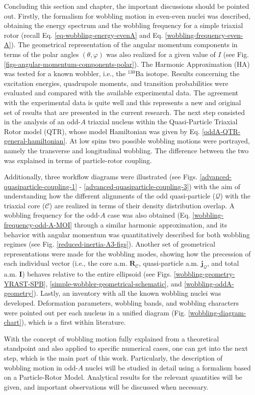 Concluding this section and chapter, the important discussions should be pointed out. Firstly, the formalism for wobbling motion in even-even nuclei was described, obtaining the energy spectrum and the wobbling frequency for a simple triaxial rotor (recall Eq. \ref{eq-wobbling-energy-evenA} and Eq. \ref{wobbling-frequency-even-A}). The geometrical representation of the angular momentum components in terms of the polar angles $(\theta,\varphi)$ was also realized for a given value of $I$ (see Fig. \ref{figs-angular-momentum-components-polar}). The Harmonic Approximation (HA) was tested for a known wobbler, i.e., the $^{130}$Ba isotope. Results concerning the excitation energies, quadrupole moments, and transition probabilities were evaluated and compared with the available experimental data. The agreement with the experimental data is quite well and this represents a new and original set of results that are presented in the current research. The next step consisted in the analysis of an odd-$A$ triaxial nucleus within the Quasi-Particle Triaxial Rotor model (QTR), whose model Hamiltonian was given by Eq. \ref{oddA-QTR-general-hamiltonian}. At low spins two possible wobbling motions were portrayed, namely the transverse and longitudinal wobbling. The difference between the two was explained in terms of particle-rotor coupling. 

Additionally, three workflow diagrams were illustrated (see Figs. \ref{advanced-quasiparticle-coupling-1} - \ref{advanced-quasiparticle-coupling-3}) with the aim of understanding how the different alignments of the odd quasi-particle ($\mathcal{Q}$) with the triaxial core ($\mathscr{C}$) are realized in terms of their density distribution overlap. A wobbling frequency for the odd-$A$ case was also obtained (Eq. \ref{wobbling-frequency-odd-A-MOI} through a similar harmonic approximation, and its behavior with angular momentum was quantitatively described for both wobbling regimes (see Fig. \ref{reduced-inertia-A3-figs}). Another set of geometrical representations were made for the wobbling modes, showing how the precession of each individual vector (i.e., the core a.m. $\mathbf{R}_\mathscr{C}$, quasi-particle a.m. $\mathbf{j}_\mathcal{Q}$, and total a.m. $\mathbf{I}$) behaves relative to the entire ellipsoid (see Figs. \ref{wobbling-geometry-YRAST-SPB}, \ref{simple-wobbler-geometrical-schematic}, and \ref{wobbling-oddA-geometry}). Lastly, an inventory with all the known wobbling nuclei was developed. Deformation parameters, wobbling bands, and wobbling characters were pointed out per each nucleus in a unified diagram (Fig. \ref{wobbling-diagram-chart}), which is a first within literature.

With the concept of wobbling motion fully explained from a theoretical standpoint and also applied to specific numerical cases, one can get into the next step, which is the main part of this work. Particularly, the description of wobbling motion in odd-$A$ nuclei will be studied in detail using a formalism based on a Particle-Rotor Model. Analytical results for the relevant quantities will be given, and important observations will be discussed when necessary.